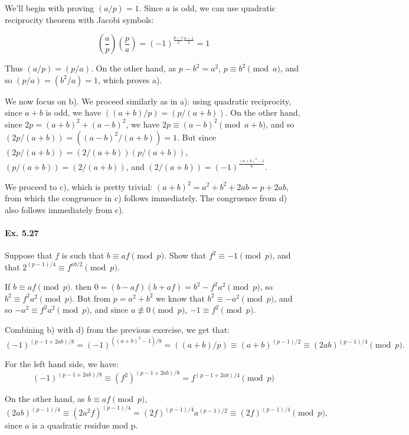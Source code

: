 \documentclass[notitlepage]{article}
\theoremstyle{definition}
\begin{document}
We'll begin with proving $(a/p) = 1$. Since $a$ is odd, we can use
quadratic reciprocity theorem with Jacobi symbols:

\begin{equation}
  \left(\frac{a}{p}\right)\left(\frac{p}{a}\right) = (-1)^{\frac{p-1}{2}\frac{a-1}{2}} = 1
\end{equation}

Thus $(a/p) = (p/a)$. On the other hand, as $p - b^2 = a^2$, $p \equiv
b^2 \pmod a$, and so $(p/a) = (b^2/a) = 1$, which proves a).

We now focus on b). We proceed similarly as in a): using quadratic
reciprocity, since $a+b$ is odd, we have $((a+b)/p) = (p/(a+b))$. On
the other hand, since $2p = (a+b)^2 + (a-b)^2$, we have $2p \equiv
(a-b)^2 \pmod {a+b}$, and so $(2p/(a+b)) = ((a-b)^2/(a+b)) = 1$. But
since $(2p/(a+b)) = (2/(a+b))(p/(a+b))$, $(p/(a+b)) = (2/(a+b))$, and
$(2/(a+b)) = (-1)^{\frac{(a+b)^2 - 1}{8}}$.

We proceed to c), which is pretty trivial: $(a+b)^2 = a^2 + b^2 + 2ab
= p + 2ab$, from which the congruence in c) follows immediately. The
congruence from d) also follows immediately from c).

\paragraph{Ex. 5.27}
Suppose that $f$ is such that $b \equiv af \pmod p$. Show that $f^2
\equiv -1 \pmod p$, and that $2^{(p-1)/4} \equiv f^{ab/2} \pmod p$.

If $b \equiv af \pmod p$. then $0 = (b-af)(b+af) = b^2 - f^2 a^2 \pmod
p$, so $b^2 \equiv f^2 a^2 \pmod p$. But from $p = a^2 + b^2$ we know
that $b^2 \equiv -a^2 \pmod p$, and so $-a^2 \equiv f^2 a^2 \pmod p$,
and since $a \not \equiv 0 \pmod p$, $-1 \equiv f^2 \pmod p$.

Combining b) with d) from the previous exercise, we get that:
\begin{equation}
(-1)^{(p-1+2ab)/8} = (-1)^{((a+b)^2 - 1)/8} = ((a+b)/p) \equiv
  (a+b)^{(p-1)/2} \equiv (2ab)^{(p-1)/4} \pmod p.
\end{equation}

For the left hand side, we have:
\begin{equation}
  (-1)^{(p-1 +2ab)/8} \equiv (f^2)^{(p-1+2ab)/8} = f^{(p-1 + 2ab)/4}
  \pmod p
\end{equation}

On the other hand, as $b \equiv af \pmod p$,
\begin{equation}
  (2ab)^{(p-1)/4} \equiv (2a^2 f)^{(p-1)/4} = (2f)^{(p-1)/4}
  a^{(p-1)/2} \equiv (2f)^{(p-1)/4} \pmod p,
\end{equation}
since $a$ is a quadratic residue mod p.
\end{document}

